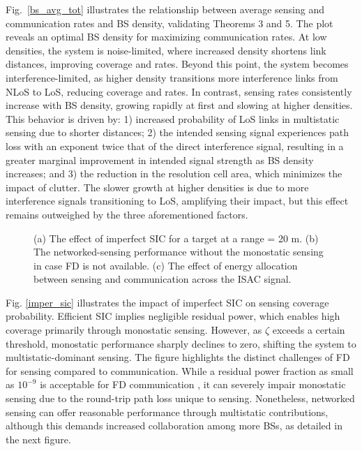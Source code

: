 \documentclass[journal]{IEEEtran}
\begin{document}
Fig.~\ref{bs_avg_tot} illustrates the relationship between average sensing and communication rates and BS density, validating Theorems 3 and 5. The plot reveals an optimal BS density for maximizing communication rates. At low densities, the system is noise-limited, where increased density shortens link distances, improving coverage and rates. Beyond this point, the system becomes interference-limited, as higher density transitions more interference links from NLoS to LoS, reducing coverage and rates.
In contrast, sensing rates consistently increase with BS density, growing rapidly at first and slowing at higher densities. This behavior is driven by: 1) increased probability of LoS links in multistatic sensing due to shorter distances;
2) the intended sensing signal experiences path loss with an exponent twice that of the direct interference signal, resulting in a greater marginal improvement in intended signal strength as BS density increases; and 3) the reduction in the resolution cell area, which minimizes the impact of clutter. The slower growth at higher densities is due to more interference signals transitioning to LoS, amplifying their impact, but this effect remains outweighed by the three  aforementioned factors.






\begin{figure*}
\centering
\subfloat[ \label{imper_sic}]{%
  
}%
\subfloat[ \label{no_fd}]{%
 
}%
\subfloat[  \label{energy_eff}]{%
 
}%
\caption{  (a)  The effect of imperfect SIC  for a target at a range = 20 m. (b) The networked-sensing performance without the monostatic sensing in case  FD is not available. (c)  The effect of energy allocation between sensing and communication across the ISAC signal.}
\end{figure*}







Fig. \ref{imper_sic} illustrates the impact of imperfect SIC on sensing coverage probability. Efficient SIC implies negligible residual power, which enables high coverage primarily through monostatic sensing. However, as $\zeta$ exceeds a certain threshold, monostatic performance sharply declines to zero, shifting the system to multistatic-dominant sensing. The figure highlights the distinct challenges of FD for sensing compared to communication. While a residual power fraction as small as $10^{-9}$ is acceptable for FD communication \cite{ali2016modeling}, it can severely impair monostatic sensing due to the round-trip path loss unique to sensing. Nonetheless, networked sensing can offer reasonable performance through multistatic contributions, although this demands increased collaboration among more BSs, as detailed in the next figure. 
\end{document}
